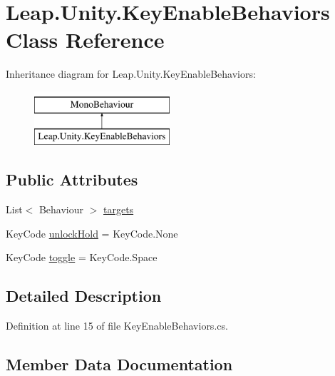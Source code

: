 \hypertarget{class_leap_1_1_unity_1_1_key_enable_behaviors}{}\section{Leap.\+Unity.\+Key\+Enable\+Behaviors Class Reference}
\label{class_leap_1_1_unity_1_1_key_enable_behaviors}
Inheritance diagram for Leap.\+Unity.\+Key\+Enable\+Behaviors\+:\begin{figure}[H]
\begin{center}
\leavevmode
\includegraphics[height=2.000000cm]{class_leap_1_1_unity_1_1_key_enable_behaviors}
\end{center}
\end{figure}
\subsection*{Public Attributes}
\begin{DoxyCompactItemize}
\item 
List$<$ Behaviour $>$ \mbox{\hyperlink{class_leap_1_1_unity_1_1_key_enable_behaviors_ad26f74ea639ce91449a5f5c97f03c064}{targets}}
\item 
Key\+Code \mbox{\hyperlink{class_leap_1_1_unity_1_1_key_enable_behaviors_ae5f7592ef59f6b20ac63df7edebe83cd}{unlock\+Hold}} = Key\+Code.\+None
\item 
Key\+Code \mbox{\hyperlink{class_leap_1_1_unity_1_1_key_enable_behaviors_ab05b7eb135878da560c5b37406577483}{toggle}} = Key\+Code.\+Space
\end{DoxyCompactItemize}


\subsection{Detailed Description}


Definition at line 15 of file Key\+Enable\+Behaviors.\+cs.



\subsection{Member Data Documentation}
\mbox{\label{class_leap_1_1_unity_1_1_key_enable_behaviors_ad26f74ea639ce91449a5f5c97f03c064}} 
